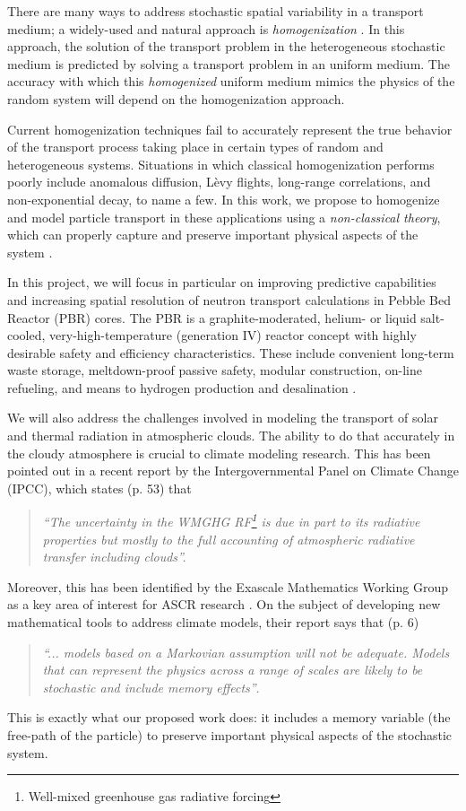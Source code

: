 \documentclass[12pt]{article}
\begin{document}
There are many ways to address stochastic spatial variability in a transport medium; a widely-used and natural approach is \textit{homogenization} \cite{dumgol00,cailac00}.
In this approach, the solution of the transport problem in the heterogeneous stochastic medium is predicted by solving a transport problem in an uniform medium.
The accuracy with which this \textit{homogenized} uniform medium mimics the physics of the random system will depend on the homogenization approach.

Current homogenization techniques fail to accurately represent the true behavior of the transport process taking place in certain types of random and heterogeneous systems.
Situations in which classical homogenization performs poorly include anomalous diffusion, L\`evy flights, long-range correlations, and non-exponential decay, to name a few.
In this work, we propose to homogenize and model particle transport in these applications using a \textit{non-classical theory}, which can properly capture and preserve important physical aspects of the system \cite{larvas11,davxu14,xudav16,vaslar14b,vas13}.

In this project, we will focus in particular on improving predictive capabilities and increasing spatial resolution of neutron transport calculations in Pebble Bed Reactor (PBR) cores.
The PBR is a graphite-moderated, helium- or liquid salt-cooled, very-high-temperature (generation IV) reactor concept with highly desirable safety and efficiency characteristics.
These include convenient long-term waste storage, meltdown-proof passive safety, modular construction, on-line refueling, and means to hydrogen production and desalination \cite{htrpm,pbmr,mpbr}.

We will also address the challenges involved in modeling the transport of solar and thermal radiation in atmospheric clouds.
The ability to do that accurately in the cloudy atmosphere is crucial to climate modeling research.
This has been pointed out in a recent report\cite{ipcc13} by the Intergovernmental Panel on Climate Change (IPCC), which states (p. 53) that
\begin{quote}
\textit{``The uncertainty in the WMGHG RF\footnote{Well-mixed greenhouse gas radiative forcing} is due in part to its radiative properties but mostly to the full accounting of atmospheric radiative transfer including clouds''.}
\end{quote}

Moreover, this has been identified by the Exascale Mathematics Working Group as a key area of interest for ASCR research \cite{amrec14}.
On the subject of developing new mathematical tools to address climate models, their report says that (p. 6)
\begin{quote}
\textit{``... models based on a Markovian assumption will not be adequate.
Models that can represent the physics across a range of scales are likely to be stochastic and include memory effects''}.
\end{quote}
This is exactly what our proposed work does: it includes a memory variable (the free-path of the particle) to preserve important physical aspects of the stochastic system.
\end{document}
